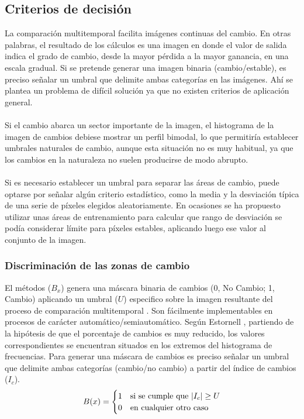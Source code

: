 \subsection{Criterios de decisi\'on}
La comparaci\'on multitemporal facilita im\'agenes continuas del cambio. En otras palabras, el resultado de los c\'alculos es una imagen en donde el valor de salida indica el grado de cambio, desde la mayor p\'erdida a la mayor ganancia, en una escala gradual. Si se pretende generar una imagen binaria (cambio/estable), es preciso se\~{n}alar un umbral que delimite ambas categor\'ias en las im\'agenes. Ah\'i se plantea un problema de dif\'icil soluci\'on ya que no existen criterios de aplicación general.\\~\\
Si el cambio abarca un sector importante de la imagen, el histograma de la imagen de cambios debiese mostrar un perfil bimodal, lo que permitir\'ia establecer umbrales naturales de cambio, aunque esta situaci\'on no es muy habitual, ya que los cambios en la naturaleza no suelen producirse de modo abrupto\cite{martinez2013normalizacion}.\\~\\
Si es necesario establecer un umbral para separar las \'areas de cambio, puede optarse por se\~{n}alar alg\'un criterio estad\'istico, como la media y la desviaci\'on t\'ipica de una serie de p\'ixeles elegidos aleatoriamente. En ocasiones se ha propuesto utilizar unas \'areas de entrenamiento para calcular que rango de desviaci\'on se pod\'ia considerar l\'imite para p\'ixeles estables, aplicando luego ese valor al conjunto de la imagen\cite{tung1988determination}.

\subsubsection{Discriminaci\'on de las zonas de cambio}\label{sec:discriminacion}
El m\'etodos ($ B_{x} $) genera una m\'ascara binaria de cambios (0, No Cambio; 1, Cambio) aplicando un umbral ($ U $) especifico sobre la imagen resultante del proceso de comparaci\'on multitemporal \cite{singh1989review}. Son f\'acilmente implementables en procesos de car\'acter autom\'atico/semiautom\'atico. Según Estornell \cite{estornell2004analisis}, partiendo de la hip\'otesis de que el porcentaje de cambios es muy reducido, los valores correspondientes se encuentran situados en los extremos del histograma de frecuencias. Para generar una m\'ascara de cambios es preciso se\~{n}alar un umbral que delimite ambas categorías (cambio/no cambio) a partir del \'indice de cambios ($ I_{c} $)\cite{radke2005image}.	
\begin{equation}
B(x) = \begin{cases}
1 & \text{si se cumple que } \lvert I_c\rvert \geq U \\
0 & \text{en cualquier otro caso}
\end{cases}
\end{equation}

